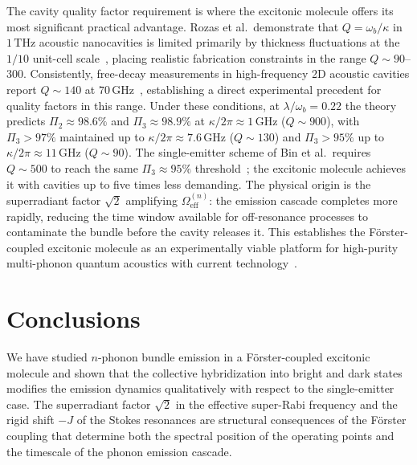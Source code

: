 \documentclass{ws-ijmpb}
\begin{document}
The cavity quality factor requirement is where the excitonic molecule offers its most 
significant practical advantage. Rozas et al.\ demonstrate that $Q = \omega_b/\kappa$ in 
$1\,\mathrm{THz}$ acoustic nanocavities is limited primarily by thickness fluctuations at the 
$1/10$ unit-cell scale~\cite{rozas2009}, placing realistic fabrication constraints in the 
range $Q \sim 90$--$300$. Consistently, free-decay measurements in high-frequency 2D acoustic 
cavities report $Q \sim 140$ at $70\,\mathrm{GHz}$~\cite{zalalutdinov2021}, establishing a 
direct experimental precedent for quality factors in this range. Under these conditions, at 
$\lambda/\omega_b = 0.22$ the theory predicts $\Pi_2 \approx 98.6\%$ and 
$\Pi_3 \approx 98.9\%$ at $\kappa/2\pi \approx 1\,\mathrm{GHz}$ ($Q \sim 900$), with 
$\Pi_3 > 97\%$ maintained up to $\kappa/2\pi \approx 7.6\,\mathrm{GHz}$ ($Q \sim 130$) and 
$\Pi_3 > 95\%$ up to $\kappa/2\pi \approx 11\,\mathrm{GHz}$ ($Q \sim 90$). The single-emitter 
scheme of Bin et al.\ requires $Q \sim 500$ to reach the same $\Pi_3 \approx 95\%$ 
threshold~\cite{bin2020}; the excitonic molecule achieves it with cavities up to five times 
less demanding. The physical origin is the superradiant factor $\sqrt{2}$ amplifying 
$\Omega_\mathrm{eff}^{(n)}$: the emission cascade completes more rapidly, reducing the time 
window available for off-resonance processes to contaminate the bundle before the cavity 
releases it. This establishes the F\"orster-coupled excitonic molecule as an experimentally 
viable platform for high-purity multi-phonon quantum acoustics with current 
technology~\cite{weig2004,rozas2009,zalalutdinov2021,macCabe2020}.


\section{Conclusions}
\label{sec:conclusions}

We have studied $n$-phonon bundle emission in a F\"orster-coupled excitonic molecule and shown 
that the collective hybridization into bright and dark states modifies the emission dynamics 
qualitatively with respect to the single-emitter case. The superradiant factor $\sqrt{2}$ in 
the effective super-Rabi frequency and the rigid shift $-J$ of the Stokes resonances are 
structural consequences of the F\"orster coupling that determine both the spectral position of 
the operating points and the timescale of the phonon emission cascade.
\end{document}
